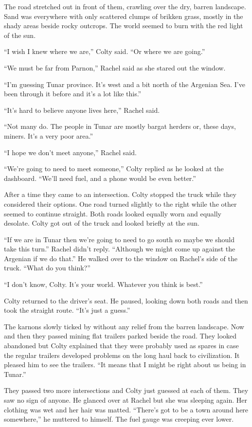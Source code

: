 The road stretched out in front of them, crawling over the dry, barren landscape. Sand was
everywhere with only scattered clumps of brikken grass, mostly in the shady areas beside rocky
outcrops. The world seemed to burn with the red light of the sun.

``I wish I knew where we are,'' Colty said. ``Or where we are going.''

``We must be far from Parnon,'' Rachel said as she stared out the window.

``I'm guessing Tunar province. It's west and a bit north of the Argenian Sea. I've been through
it before and it's a lot like this.''

``It's hard to believe anyone lives here,'' Rachel said.

``Not many do. The people in Tunar are mostly bargat herders or, these days, miners. It's a very
poor area.''

``I hope we don't meet anyone,'' Rachel said.

``We're going to need to meet someone,'' Colty replied as he looked at the dashboard. ``We'll
need fuel, and a phone would be even better.''

After a time they came to an intersection. Colty stopped the truck while they considered their
options. One road turned slightly to the right while the other seemed to continue straight. Both
roads looked equally worn and equally desolate. Colty got out of the truck and looked briefly at
the sun.

``If we are in Tunar then we're going to need to go south so maybe we should take this turn.''
Rachel didn't reply. ``Although we might come up against the Argenian if we do that.'' He walked
over to the window on Rachel's side of the truck. ``What do you think?''

``I don't know, Colty. It's your world. Whatever you think is best.''

Colty returned to the driver's seat. He paused, looking down both roads and then took the
straight route. ``It's just a guess.''

The karnons slowly ticked by without any relief from the barren landscape. Now and then they
passed mining flat trailers parked beside the road. They looked abandoned but Colty explained
that they were probably used as spares in case the regular trailers developed problems on the
long haul back to civilization. It pleased him to see the trailers. ``It means that I might be
right about us being in Tunar.''

They passed two more intersections and Colty just guessed at each of them. They saw no sign of
anyone. He glanced over at Rachel but she was sleeping again. Her clothing was wet and her hair
was matted. ``There's got to be a town around here somewhere,'' he muttered to himself. The fuel
gauge was creeping ever lower.

